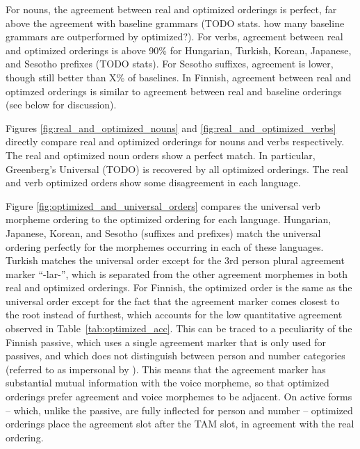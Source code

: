 \documentclass[11pt,letterpaper]{article}
\newcommand{\citep}{\parencite}
\newcommand\becky[1]{{\color{blue}(#1)}}
\begin{document}
For nouns, the agreement between real and optimized orderings is perfect, far above the agreement with baseline grammars (TODO stats. how many baseline grammars are outperformed by optimized?).
For verbs, agreement between real and optimized orderings is above 90\% for Hungarian, Turkish, Korean, Japanese, and Sesotho prefixes (TODO stats).
For Sesotho suffixes, agreement is lower, though still better than X\% of baselines.
In Finnish, agreement between real and optimzed orderings is similar to agreement between real and baseline orderings (see below for discussion).

Figures \ref{fig:real_and_optimized_nouns} and \ref{fig:real_and_optimized_verbs} directly compare real and optimized orderings for nouns and verbs respectively.
The real and optimized noun orders show a perfect match.
In particular, Greenberg's Universal (TODO) is recovered by all optimized orderings.
The real and verb optimized orders show some disagreement in each language.

Figure \ref{fig:optimized_and_universal_orders} compares the universal verb morpheme ordering to the optimized ordering for each language.
Hungarian, Japanese, Korean, and Sesotho (suffixes and prefixes) match the universal ordering perfectly for the morphemes occurring in each of these languages. 
Turkish matches the universal order except for the 3rd person plural agreement marker ``-lar-'', which is separated from the other agreement morphemes in both real and optimized orderings.
For Finnish, the optimized order is the same as the universal order except for the fact that the agreement marker comes closest to the root instead of furthest, which accounts for the low quantitative agreement observed in Table~\ref{tab:optimized_acc}.
This can be traced to a peculiarity of the Finnish passive, which uses a single agreement marker that is only used for passives, and which does not distinguish between person and number categories (referred to as impersonal by \citep[Section 69]{karlsson1999finnish}).
This means that the agreement marker has substantial mutual information with the voice morpheme, so that optimized orderings prefer agreement and voice morphemes to be adjacent.
On active forms -- which, unlike the passive, are fully inflected for person and number -- optimized orderings place the agreement slot after the TAM slot, in agreement with the real ordering.
\end{document}
